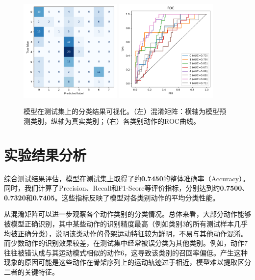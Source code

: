 \documentclass[UTF8]{article}
\begin{document}
\begin{figure}[htbp]
    \centering
    \includegraphics[width=0.45\textwidth]{confusion_matrix.png}
    \quad
    \includegraphics[width=0.45\textwidth]{roc_curves.png}
    \caption{模型在测试集上的分类结果可视化。（左）混淆矩阵：横轴为模型预测类别，纵轴为真实类别；（右）各类别动作的ROC曲线。}
    \label{fig:results}
\end{figure}

\section{实验结果分析}

综合测试结果评估，模型在测试集上取得了约\textbf{0.7450}的整体准确率（Accuracy）。同时，我们计算了Precision、Recall和F1-Score等评价指标，分别达到约\textbf{0.7500}、\textbf{0.7320}和\textbf{0.7405}。这些指标反映了模型对各类别动作的平均分类性能。

从混淆矩阵可以进一步观察各个动作类别的分类情况。总体来看，大部分动作能够被模型正确识别，其中某些动作的识别精度最高（例如类别3的所有测试样本几乎均被正确分类），说明该类动作的骨架运动特征较为鲜明，不易与其他动作混淆。而少数动作的识别效果较差，在测试集中经常被误分类为其他类别。例如，动作7往往被错认成与其运动模式相似的动作6，这导致该类别的召回率偏低。产生这种现象的原因可能是这些动作在骨架序列上的运动轨迹过于相近，模型难以提取区分二者的关键特征。
\end{document}
